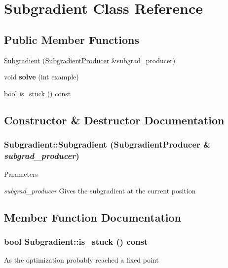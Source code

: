 \hypertarget{class_subgradient}{
\section{Subgradient Class Reference}
\label{class_subgradient}
}
\subsection*{Public Member Functions}
\begin{DoxyCompactItemize}
\item 
\hyperlink{class_subgradient_a2509e39964e1280532fd4994b3d747ce}{Subgradient} (\hyperlink{class_subgradient_producer}{SubgradientProducer} \&subgrad\_\-producer)
\item 
\hypertarget{class_subgradient_a183205851cdb362195baf914fb8d3ae0}{
void {\bfseries solve} (int example)}
\label{class_subgradient_a183205851cdb362195baf914fb8d3ae0}

\item 
bool \hyperlink{class_subgradient_a54907389766b702c467cf2ab20f8d051}{is\_\-stuck} () const 
\end{DoxyCompactItemize}


\subsection{Constructor \& Destructor Documentation}
\hypertarget{class_subgradient_a2509e39964e1280532fd4994b3d747ce}{
\subsubsection[{Subgradient}]{\setlength{\rightskip}{0pt plus 5cm}Subgradient::Subgradient ({\bf SubgradientProducer} \& {\em subgrad\_\-producer})}}
\label{class_subgradient_a2509e39964e1280532fd4994b3d747ce}

\begin{DoxyParams}{Parameters}
\item[{\em subgrad\_\-producer}]Gives the subgradient at the current position \end{DoxyParams}


\subsection{Member Function Documentation}
\hypertarget{class_subgradient_a54907389766b702c467cf2ab20f8d051}{
\subsubsection[{is\_\-stuck}]{\setlength{\rightskip}{0pt plus 5cm}bool Subgradient::is\_\-stuck () const}}
\label{class_subgradient_a54907389766b702c467cf2ab20f8d051}
As the optimization probably reached a fixed point


